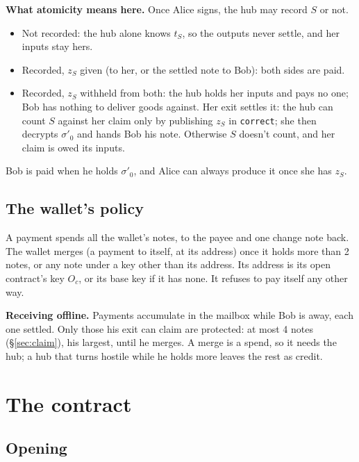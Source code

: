 \documentclass[11pt]{article}
\theoremstyle{plain}
\theoremstyle{definition}
\newcommand{\tx}[1]{\texttt{#1}}
\newcommand{\Oc}{O_c}
\begin{document}
\textbf{What atomicity means here.} Once Alice signs, the hub may record
$S$ or not.
\begin{itemize}[nosep]
\item Not recorded: the hub alone knows $t_S$, so the outputs never
  settle, and her inputs stay hers.
\item Recorded, $z_S$ given (to her, or the settled note to Bob): both
  sides are paid.
\item Recorded, $z_S$ withheld from both: the hub holds her inputs and
  pays no one; Bob has nothing to deliver goods against. Her exit
  settles it: the hub can count $S$ against her claim only by publishing
  $z_S$ in \tx{correct}; she then decrypts $\sigma'_0$ and hands Bob
  his note. Otherwise $S$ doesn't count, and her claim is owed its
  inputs.
\end{itemize}
Bob is paid when he holds $\sigma'_0$, and Alice can always produce it
once she has $z_S$.

\subsection{The wallet's policy}

A payment spends all the wallet's notes, to the payee and one change
note back. The wallet merges (a payment to itself, at its address) once
it holds more than 2 notes, or any note under a key other than its
address. Its address is its open contract's key $\Oc$, or its base key
if it has none. It refuses to pay itself any other way.

\textbf{Receiving offline.} Payments accumulate in the mailbox while
Bob is away, each one settled. Only those his exit can claim are
protected: at most 4 notes (\S\ref{sec:claim}), his largest, until he
merges. A merge is a spend, so it needs the hub; a hub that turns
hostile while he holds more leaves the rest as credit.

\section{The contract}

\subsection{Opening}\label{sec:opening}
\end{document}
